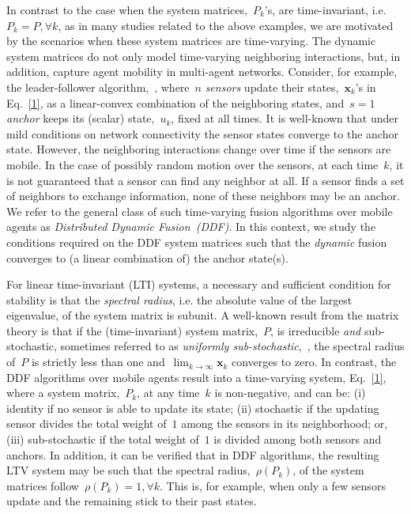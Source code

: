 \documentclass[draftclsnofoot, onecolumn, 12pt]{IEEEtran}
\def\mb{\mathbf}
\begin{document}
In contrast to the case when the system matrices,~$P_k$'s, are time-invariant, i.e.~$P_k=P,\forall k$, as in many studies related to the above examples, we are motivated by the scenarios when these system matrices are time-varying. The dynamic system matrices do not only model time-varying neighboring interactions, but, in addition, capture agent mobility in multi-agent networks. Consider, for example, the leader-follower algorithm,~\cite{tanner02,4200874}, where~$n$ \emph{sensors} update their states,~$\mb{x}_k$'s in Eq.~\eqref{1}, as a linear-convex combination of the neighboring states, and~$s=1$ \emph{anchor} keeps its (scalar) state,~$u_k$, fixed at all times. It is well-known that under mild conditions on network connectivity the sensor states converge to the anchor state. However, the neighboring interactions change over time if the sensors are  mobile. In the case of possibly random motion over the sensors, at each time~$k$, it is not guaranteed that a sensor can find any neighbor at all. If a sensor finds a set of neighbors to exchange information, none of these neighbors may be an anchor. We refer to the general class of such time-varying fusion algorithms over mobile agents as \emph{Distributed Dynamic Fusion~(DDF)}. In this context, we study the conditions required on the DDF system matrices such that the \emph{dynamic} fusion converges to (a linear combination of) the anchor state(s).

For linear time-invariant (LTI) systems, a necessary and sufficient condition for stability is that the \textit{spectral radius}, i.e. the absolute value of the largest eigenvalue, of the system matrix is subunit. A well-known result from the matrix theory is that if the (time-invariant) system matrix,~$P$, is irreducible \textit{and} sub-stochastic, sometimes referred to as \emph{uniformly sub-stochastic},~\cite{kolpakov,kolpakov_rus:83}, the spectral radius of~$P$ is strictly less than one and~$\lim_{k \rightarrow \infty}\mb{x}_k$ converges to zero. In contrast, the DDF algorithms over mobile agents result into a time-varying system, Eq.~\eqref{1}, where a system matrix,~$P_k$, at any time~$k$ is non-negative, and can be: (i) identity if no sensor is able to update its state; (ii) stochastic if the updating sensor divides the total weight of~$1$ among the sensors in its neighborhood; or, (iii) sub-stochastic if the total weight of~$1$ is divided among both sensors and anchors. In addition, it can be verified that in DDF algorithms, the resulting LTV system may be such that the spectral radius,~$\rho(P_k)$, of the system matrices follow~$\rho(P_k)=1,\forall k$. This is, for example, when only a few sensors update and the remaining stick to their past states. 
 
\end{document}
